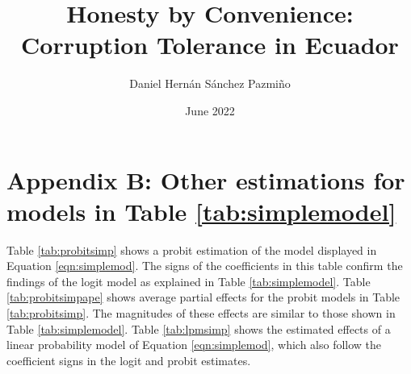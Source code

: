 \documentclass[12pt,a4]{article}
\title{Honesty by Convenience: Corruption Tolerance in Ecuador}
\author{Daniel Hernán Sánchez Pazmiño}
\date{June 2022}
\begin{document}

\section{Appendix B: Other estimations for models in Table \ref{tab:simplemodel}}
\label{app:second}
Table \ref{tab:probitsimp} shows a probit estimation of the model displayed in Equation \ref{eqn:simplemod}. The signs of the coefficients in this table confirm the findings of the logit model as explained in Table \ref{tab:simplemodel}. Table \ref{tab:probitsimpape} shows average partial effects for the probit models in Table \ref{tab:probitsimp}. The magnitudes of these effects are similar to those shown in Table \ref{tab:simplemodel}. Table \ref{tab:lpmsimp} shows the estimated effects of a linear probability model of Equation \ref{eqn:simplemod}, which also follow the coefficient signs in the logit and probit estimates.
\end{document}
